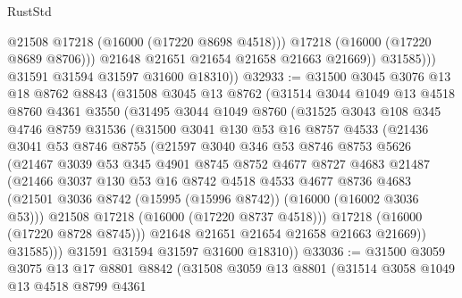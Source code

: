 \begin{lexlean}{RustStd}
\begin{coremodule}
                      @21508
                      @17218
                      (@16000 (@17220 @8698 @4518)))
                    @17218
                    (@16000 (@17220 @8689 @8706)))
                  @21648
                  @21651
                  @21654
                  @21658
                  @21663
                  @21669))
              @31585)))
        @31591
        @31594
        @31597
        @31600
        @18310))
@32933 := @31500
    @3045
    @3076
    @13
    @18
    @8762
    @8843
    (@31508
      @3045
      @13
      @8762
      (@31514
        @3044
        @1049
        @13
        @4518
        @8760
        @4361
        @3550
        (@31495
          @3044
          @1049
          @8760
          (@31525
            @3043
            @108
            @345
            @4746
            @8759
            @31536
            (@31500
              @3041
              @130
              @53
              @16
              @8757
              @4533
              (@21436
                @3041
                @53
                @8746
                @8755
                (@21597
                  @3040
                  @346
                  @53
                  @8746
                  @8753
                  @5626
                  (@21467
                    @3039
                    @53
                    @345
                    @4901
                    @8745
                    @8752
                    @4677
                    @8727
                    @4683
                    @21487
                    (@21466
                      @3037
                      @130
                      @53
                      @16
                      @8742
                      @4518
                      @4533
                      @4677
                      @8736
                      @4683
                      (@21501 @3036 @8742 (@15995 (@15996 @8742)) (@16000 (@16002 @3036 @53)))
                      @21508
                      @17218
                      (@16000 (@17220 @8737 @4518)))
                    @17218
                    (@16000 (@17220 @8728 @8745)))
                  @21648
                  @21651
                  @21654
                  @21658
                  @21663
                  @21669))
              @31585)))
        @31591
        @31594
        @31597
        @31600
        @18310))
@33036 := @31500
    @3059
    @3075
    @13
    @17
    @8801
    @8842
    (@31508
      @3059
      @13
      @8801
      (@31514
        @3058
        @1049
        @13
        @4518
        @8799
        @4361

\end{coremodule}
\end{lexlean}

